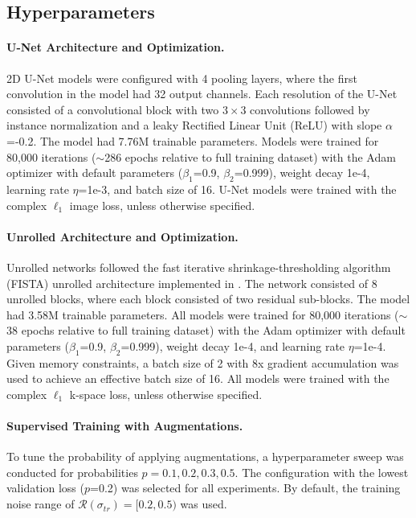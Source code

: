 \documentclass[10pt,twocolumn,letterpaper]{article}
\newcommand{\noiserange}{\mathcal{R}(\sigma_{tr})}
\newcommand{\RV}[1]{{#1}}
\begin{document}
\subsection{Hyperparameters}
\label{app:hyperparameters}
 
\paragraph{U-Net Architecture and Optimization.} 2D U-Net models \cite{ronneberger2015u} were configured with 4 pooling layers, where the first convolution in the model had 32 output channels. Each resolution of the U-Net consisted of a convolutional block with two $3 \times 3$ convolutions followed by instance normalization and a leaky Rectified Linear Unit (ReLU) with slope $\alpha$=-0.2. \RV{The model had 7.76M trainable parameters.} Models were trained for 80,000 iterations \RV{($\sim$286 epochs relative to full training dataset)} with the Adam optimizer \cite{kingma2014adam} with default parameters ($\beta_1$=0.9, $\beta_2$=0.999), weight decay 1e-4, learning rate $\eta$=1e-3, and batch size of 16. U-Net models were trained with the complex $\ell_1$ image loss, unless otherwise specified.\\

\paragraph{Unrolled Architecture and Optimization.} Unrolled networks followed the fast iterative shrinkage-thresholding algorithm (FISTA) unrolled architecture \cite{xin2022fista} implemented in \cite{sandino2020compressed}. The network consisted of 8 unrolled blocks, where each block consisted of two residual sub-blocks. The model had 3.58M trainable parameters. All models were trained for 80,000 iterations ($\sim$38 epochs relative to full training dataset) with the Adam optimizer \cite{kingma2014adam} with default parameters ($\beta_1$=0.9, $\beta_2$=0.999), weight decay 1e-4, and learning rate $\eta$=1e-4. Given memory constraints, a batch size of 2 with 8x gradient accumulation was used to achieve an effective batch size of 16. All models were trained with the complex $\ell_1$ k-space loss, unless otherwise specified.

\paragraph{Supervised Training with Augmentations.} To tune the probability of applying augmentations, a hyperparameter sweep was conducted for probabilities $p=0.1,0.2,0.3,0.5$. The configuration with the lowest validation loss ($p$=0.2) was selected for all experiments. By default, the training noise range of $\noiserange=[0.2,0.5)$ was used.
\end{document}
